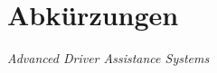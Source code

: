 \renewcommand*{\acsfont}[1]{\normalfont{\normalsize{#1}}}

\chapter*{Abkürzungen}

\begin{acronym}[Abkürzungen]
   
        		{\textit{Advanced Driver Assistance Systems}}
   
   

   


       
   
   
   
   

     
   

   
		

   
   
   
   

\end{acronym}